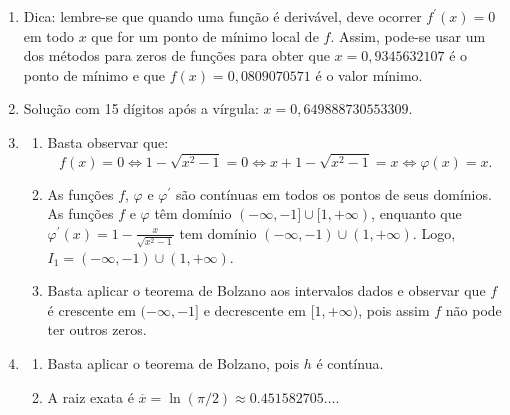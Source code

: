 \documentclass[12pt,a4paper]{article}
\begin{document}
\begin{enumerate}
\item Dica: lembre-se que quando uma função é derivável, deve ocorrer $f^\prime(x) = 0$ em todo $x$ que for um ponto de mínimo local de $f$. Assim, pode-se usar um dos métodos para zeros de funções para obter que $x = 0,9345632107$ é o ponto de mínimo e que $f(x) = 0,0809070571$ é o valor mínimo.
\item Solução com 15 dígitos após a vírgula: $x = 0,649888730553309$.
\item
\begin{enumerate}
\item Basta observar que:
\[
f(x) = 0
\Leftrightarrow
1 - \sqrt{x^2 - 1} = 0
\Leftrightarrow
x + 1 - \sqrt{x^2 - 1} = x
\Leftrightarrow
\varphi(x) = x.
\]
\item As funções $f$, $\varphi$ e $\varphi^\prime$ são contínuas em todos os pontos de seus domínios. As funções $f$ e $\varphi$ têm domínio $(-\infty, -1] \cup [1, +\infty)$, enquanto que $\varphi^\prime(x) = 1 - \frac{x}{\sqrt{x^2 - 1}}$ tem domínio $(-\infty, -1) \cup (1, +\infty)$. Logo, $I_1 = (-\infty, -1) \cup (1, +\infty)$.
\item Basta aplicar o teorema de Bolzano aos intervalos dados e observar que $f$ é crescente em $(-\infty, -1]$ e decrescente em $[1, +\infty)$, pois assim $f$ não pode ter outros zeros.
\end{enumerate}
\item \begin{enumerate}
\item Basta aplicar o teorema de Bolzano, pois $h$ é contínua.
\item A raiz exata é $\overline{x} = \ln(\pi/2) \approx 0.451582705\ldots$.
\end{enumerate}
\end{enumerate}
\end{document}
